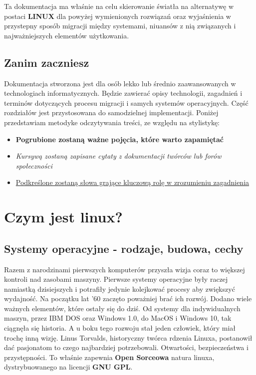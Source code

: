 \documentclass[10pt,a4paper]{report}
\begin{document}
Ta dokumentacja ma właśnie na celu skierowanie światła na alternatywę w postaci \textbf{LINUX} dla powyżej wymienionych rozwiązań oraz wyjaśnienia w przystepny sposób migracji między systemami, niuansów z nią związanych i najważniejszych elementów użytkowania.
	
	\section{Zanim zaczniesz}
	
Dokumentacja stworzona jest dla osób lekko lub średnio zaawansowanych w technologiach informatycznych. Będzie zawierać opisy technologii, zagadnień i terminów dotyczących procesu migracji i samych systemów operacyjnych. Część rozdziałów jest przystosowana do samodzielnej implementacji. Poniżej przedstawiam metodyke odczytywania treści, ze względu na stylistykę:
\begin{itemize}
\item \textbf{Pogrubione zostaną ważne pojęcia, które warto zapamiętać}
\item \textsl{Kursywą zostaną zapisane cytaty z dokumentacji twórców lub forów społeczności}
\item \underline{Podkreślone zostaną słowa grające kluczową rolę w zrozumieniu zagadnienia}
\end{itemize}


\tableofcontents
\newpage

\chapter{Czym jest linux?}

	\section{Systemy operacyjne - rodzaje, budowa, cechy}

Razem z narodzinami pierwszych komputerów przyszła wizja coraz to większej kontroli nad zasobami maszyny. Pierwsze systemy operacyjne były raczej namiastką dzisiejszych i potrafiły jedynie kolejkować procesy aby zwiększyć wydajność. Na początku lat '60 zaczęto poważniej brać ich rozwój. Dodano wiele ważnych elementów, które ostały się do dziś. Od systemy dla indywidualnych maszyn, przez IBM DOS oraz Windows 1.0, do MacOS i Windows 10, tak ciągnęła się historia. A u boku tego rozwoju stał jeden człowiek, który miał trochę inną wizję. Linus Torvalds, historyczny twórca rdzenia Linuxa, postanowił dać pasjonatom to czego najbardziej potrzebowali. Otwartości, bezpieczeństwa i przystępności. To właśnie zapewnia \textbf{Open Sorceowa} natura linuxa, dystrybuowanego na licencji \textbf{GNU GPL}.\\
\end{document}
